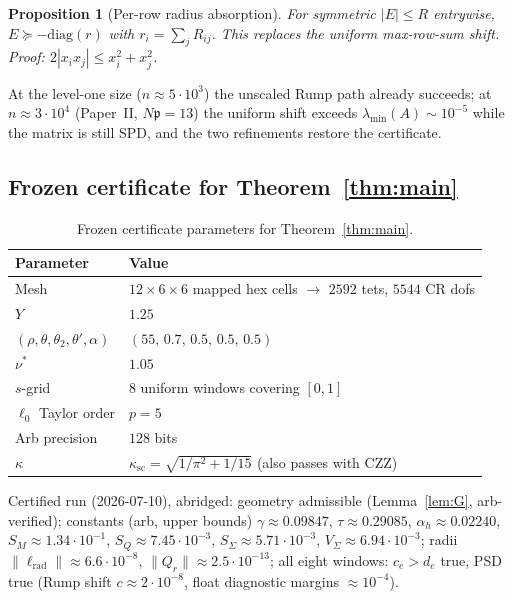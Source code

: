 \documentclass[11pt]{amsart}
\newtheorem{proposition}[theorem]{Proposition}
\begin{document}
\begin{proposition}[Per-row radius absorption]\label{prop:perrow}
For symmetric $|E|\le R$ entrywise,
$E\succeq-\mathrm{diag}(r)$ with $r_i=\sum_j R_{ij}$.  This replaces the
uniform max-row-sum shift.  Proof: $2|x_i x_j|\le x_i^2+x_j^2$.
\end{proposition}

At the level-one size ($n\approx 5\cdot 10^3$) the unscaled Rump path
already succeeds; at $n\approx 3\cdot 10^4$ (Paper~II, $N\mathfrak{p}=13$)
the uniform shift exceeds $\lambda_{\min}(A)\sim 10^{-5}$ while the matrix
is still SPD, and the two refinements restore the certificate.

\subsection{Frozen certificate for Theorem~\ref{thm:main}}

\begin{table}[ht]
\centering
\begin{tabular}{@{}ll@{}}
\toprule
Parameter & Value \\
\midrule
Mesh & $12\times 6\times 6$ mapped hex cells $\to$ $2592$ tets, $5544$ CR dofs \\
$Y$ & $1.25$ \\
$(\rho,\theta,\theta_2,\theta',\alpha)$ & $(55,\,0.7,\,0.5,\,0.5,\,0.5)$ \\
$\nu^*$ & $1.05$ \\
$s$-grid & $8$ uniform windows covering $[0,1]$ \\
$\ell_0$ Taylor order & $p=5$ \\
Arb precision & $128$ bits \\
$\kappa$ & $\kappa_{\mathrm{sc}}=\sqrt{1/\pi^2+1/15}$ (also passes with CZZ) \\
\bottomrule
\end{tabular}
\caption{Frozen certificate parameters for Theorem~\ref{thm:main}.}
\label{tab:frozen1}
\end{table}

Certified run (2026-07-10), abridged: geometry admissible
(Lemma~\ref{lem:G}, arb-verified); constants (arb, upper bounds)
$\gamma\approx 0.09847$, $\tau\approx 0.29085$, $\alpha_h\approx 0.02240$,
$S_M\approx 1.34\cdot 10^{-1}$, $S_Q\approx 7.45\cdot 10^{-3}$,
$S_\Sigma\approx 5.71\cdot 10^{-3}$, $V_\Sigma\approx 6.94\cdot 10^{-3}$;
radii $\|\ell_{\mathrm{rad}}\|\approx 6.6\cdot 10^{-8}$,
$\|Q_r\|\approx 2.5\cdot 10^{-13}$; all eight windows:
$c_e>d_e$ true, PSD true (Rump shift $c\approx 2\cdot 10^{-8}$, float
diagnostic margins $\approx 10^{-4}$).
\end{document}
